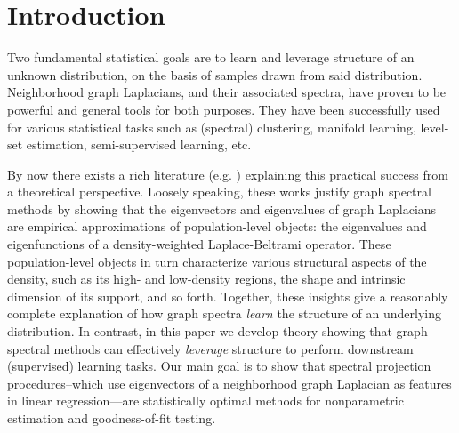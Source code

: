 \section{Introduction}
\label{sec:introduction}
Two fundamental statistical goals are to learn and leverage structure of an unknown distribution, on the basis of samples drawn from said distribution. Neighborhood graph Laplacians, and their associated spectra, have proven to be powerful and general tools for both purposes. They have been successfully used for various statistical tasks such as (spectral) clustering, manifold learning, level-set estimation, semi-supervised learning, etc.

By now there exists a rich literature (e.g. \citep{koltchinskii2000,belkin07,vonluxburg2008,burago2014,shi2015,singer2017,garciatrillos18,trillos2019, calder2019, cheng2021,dunson2021}) explaining this practical success from a theoretical perspective. Loosely speaking, these works justify graph spectral methods by showing that the eigenvectors and eigenvalues of graph Laplacians are empirical approximations of population-level objects: the eigenvalues and eigenfunctions of a density-weighted Laplace-Beltrami operator. These population-level objects in turn characterize various structural aspects of the density, such as its high- and low-density regions, the shape and intrinsic dimension of its support, and so forth. Together, these insights give a reasonably complete explanation of how graph spectra \emph{learn} the structure of an underlying distribution. In contrast, in this paper we develop theory showing that graph spectral methods can effectively \emph{leverage} structure to perform downstream (supervised) learning tasks. Our main goal is to show that spectral projection procedures--which use eigenvectors of a neighborhood graph Laplacian as features in linear regression---are statistically optimal methods for nonparametric estimation and goodness-of-fit testing.


